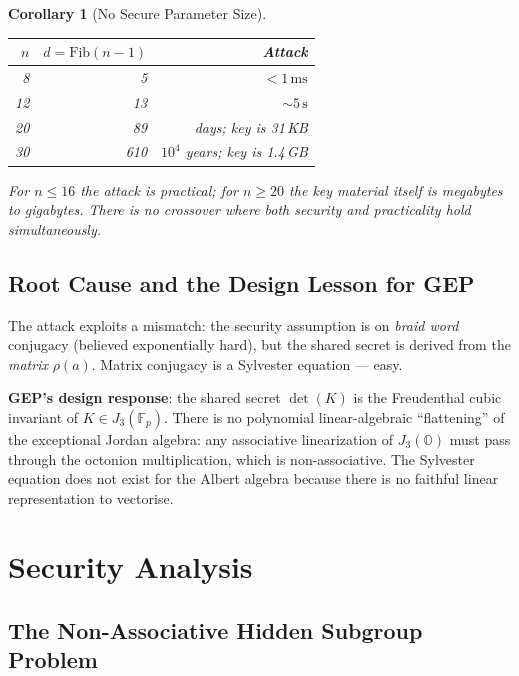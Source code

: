 \documentclass[11pt,letterpaper]{article}
\newtheorem{corollary}[theorem]{Corollary}
\theoremstyle{definition}
\begin{document}
\begin{corollary}[No Secure Parameter Size]
\begin{center}
\begin{tabular}{rrr}
\toprule
$n$ & $d = \mathrm{Fib}(n-1)$ & Attack \\ \midrule
8  & 5     & ${<}1\,\mathrm{ms}$ \\
12 & 13    & ${\sim}5\,\mathrm{s}$ \\
20 & 89    & days; key is 31\,KB \\
30 & 610   & $10^4$ years; key is 1.4\,GB \\
\bottomrule
\end{tabular}
\end{center}
For $n \leq 16$ the attack is practical; for $n \geq 20$ the key material itself
is megabytes to gigabytes.  There is no crossover where both security and
practicality hold simultaneously.
\end{corollary}

\subsection{Root Cause and the Design Lesson for GEP}

The attack exploits a mismatch: the security assumption is on \emph{braid word}
conjugacy (believed exponentially hard), but the shared secret is derived from
the \emph{matrix} $\rho(a)$.  Matrix conjugacy is a Sylvester equation --- easy.

\textbf{GEP's design response}: the shared secret $\det(K)$ is the Freudenthal
cubic invariant of $K \in J_3(\mathbb{F}_p)$.  There is no polynomial
linear-algebraic ``flattening'' of the exceptional Jordan algebra: any
associative linearization of $J_3(\mathbb{O})$ must pass through the octonion
multiplication, which is non-associative.  The Sylvester equation does not exist
for the Albert algebra because there is no faithful linear representation to
vectorise.

\section{Security Analysis}
\label{sec:security}

\subsection{The Non-Associative Hidden Subgroup Problem}
\end{document}
